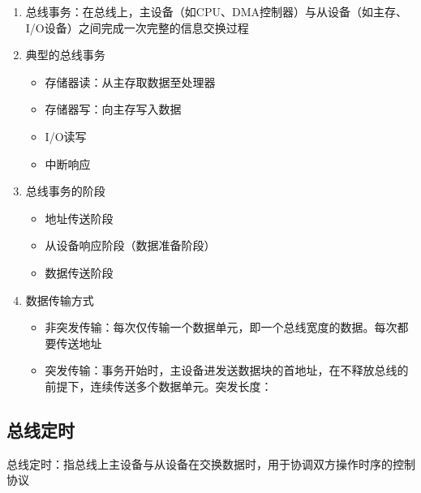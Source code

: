 \documentclass[./computer-organization-and-architecture.tex]{subfiles}
\begin{document}
    \begin{enumerate}
        \item 总线事务：在总线上，主设备（如CPU、DMA控制器）与从设备（如主存、I/O设备）之间完成一次完整的信息交换过程
        \item 典型的总线事务
        \begin{itemize}
            \item 存储器读：从主存取数据至处理器
            \item 存储器写：向主存写入数据
            \item I/O读写
            \item 中断响应
        \end{itemize}
        \item 总线事务的阶段
        \begin{itemize}
            \item 地址传送阶段
            \item 从设备响应阶段（数据准备阶段）
            \item 数据传送阶段
        \end{itemize}
        \item 数据传输方式
        \begin{itemize}
            \item 非突发传输：每次仅传输一个数据单元，即一个总线宽度的数据。每次都要传送地址
            \item 突发传输：事务开始时，主设备进发送数据块的首地址，在不释放总线的前提下，连续传送多个数据单元。突发长度：
        \end{itemize}
    \end{enumerate}

    \subsection{总线定时}

    总线定时：指总线上主设备与从设备在交换数据时，用于协调双方操作时序的控制协议
\end{document}
